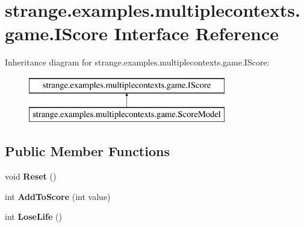 \hypertarget{interfacestrange_1_1examples_1_1multiplecontexts_1_1game_1_1_i_score}{\section{strange.\-examples.\-multiplecontexts.\-game.\-I\-Score Interface Reference}
\label{interfacestrange_1_1examples_1_1multiplecontexts_1_1game_1_1_i_score}
}
Inheritance diagram for strange.\-examples.\-multiplecontexts.\-game.\-I\-Score\-:\begin{figure}[H]
\begin{center}
\leavevmode
\includegraphics[height=2.000000cm]{interfacestrange_1_1examples_1_1multiplecontexts_1_1game_1_1_i_score}
\end{center}
\end{figure}
\subsection*{Public Member Functions}
\begin{DoxyCompactItemize}
\item 
\hypertarget{interfacestrange_1_1examples_1_1multiplecontexts_1_1game_1_1_i_score_ae51e73ab467ceed6778f8f45970fcbb5}{void {\bfseries Reset} ()}\label{interfacestrange_1_1examples_1_1multiplecontexts_1_1game_1_1_i_score_ae51e73ab467ceed6778f8f45970fcbb5}

\item 
\hypertarget{interfacestrange_1_1examples_1_1multiplecontexts_1_1game_1_1_i_score_a3ef828e6186d5695c030c39ffe033be9}{int {\bfseries Add\-To\-Score} (int value)}\label{interfacestrange_1_1examples_1_1multiplecontexts_1_1game_1_1_i_score_a3ef828e6186d5695c030c39ffe033be9}

\item 
\hypertarget{interfacestrange_1_1examples_1_1multiplecontexts_1_1game_1_1_i_score_a42220cffe80abae538d6b68ac8fffbd3}{int {\bfseries Lose\-Life} ()}\label{interfacestrange_1_1examples_1_1multiplecontexts_1_1game_1_1_i_score_a42220cffe80abae538d6b68ac8fffbd3}

\end{DoxyCompactItemize}
